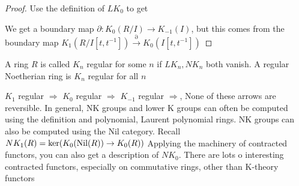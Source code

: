 \documentclass[main]{subfiles}
\begin{document}
\begin{theorem}

\end{theorem}

\begin{proof}
Use the definition of $LK_0$ to get
\begin{center}
\end{center}
We get a boundary map $\partial:K_0(R/I)\to K_{-1}(I)$, but this comes from the boundary map $K_1(R/I[t,t^{-1}])\xrightarrow\partial K_0(I[t,t^{-1}])$
\end{proof}

\begin{definition}
A ring $R$ is called $K_n$ regular for some $n$ if $LK_n,NK_n$ both vanish. A regular Noetherian ring is $K_n$ regular for all $n$
\end{definition}

\begin{fact}
$K_1$ regular $\Rightarrow$ $K_0$ regular $\Rightarrow$ $K_{-1}$ regular $\Rightarrow$, None of these arrows are reversible. In general, NK groups and lower K groups can often be computed using the definition and polynomial, Laurent polynomial rings. NK groups can also be computed using the Nil category. Recall $NK_1(R)=\ker(K_0(\operatorname{Nil}(R))\to K_0(R))$ Applying the machinery of contracted functors, you can also get a description of $NK_0$. There are lots o interesting contracted functors, especially on commutative rings, other than K-theory functors
\end{fact}
\end{document}
